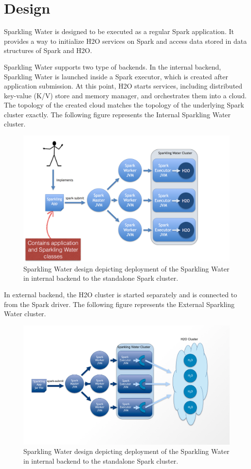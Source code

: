 \documentclass{standalone}
\begin{document}
\section{Design}
Sparkling Water is designed to be executed as a regular Spark application. It provides a way to initialize H2O services on Spark and access data stored in data structures of Spark and H2O.

Sparkling Water supports two type of backends. In the internal backend, Sparkling Water is launched inside
a Spark executor, which is created after application submission. At this point, H2O starts services,
including distributed key-value (K/V) store and memory manager, and orchestrates them into a cloud.
The topology of the created cloud matches the topology of the underlying Spark cluster exactly.
The following figure represents the Internal Sparkling Water cluster.


\begin{figure}[h!]
	\centering
	\includegraphics[scale=0.6]{../images/Topology-internal.png}
	\caption{Sparkling Water design depicting deployment of the Sparkling Water in internal backend to the standalone Spark cluster.}
\end{figure}

In external backend, the H2O cluster is started separately and is connected to from the Spark driver. The following figure represents the External Sparkling Water cluster.

\begin{figure}[h!]
	\centering
	\includegraphics[scale=0.4]{../images/Topology-external.png}
	\caption{Sparkling Water design depicting deployment of the Sparkling Water in internal backend to the standalone Spark cluster.}
\end{figure}
\end{document}
